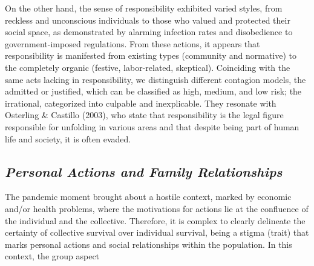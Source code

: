 \documentclass{article}
\begin{document}
On the other hand, the sense of responsibility exhibited varied styles, from reckless and unconscious individuals to those who valued and protected their social space, as demonstrated by alarming infection rates and disobedience to government-imposed regulations. From these actions, it appears that responsibility is manifested from existing types (community and normative) to the completely organic (festive, labor-related, skeptical). Coinciding with the same acts lacking in responsibility, we distinguish different contagion models, the admitted or justified, which can be classified as high, medium, and low risk; the irrational, categorized into culpable and inexplicable. They resonate with Osterling \& Castillo (2003), who state that responsibility is the legal figure responsible for unfolding in various areas and that despite being part of human life and society, it is often evaded.

\subsection{\textit{Personal Actions and Family Relationships}}

The pandemic moment brought about a hostile context, marked by economic and/or health problems, where the motivations for actions lie at the confluence of the individual and the collective. Therefore, it is complex to clearly delineate the certainty of collective survival over individual survival, being a stigma (trait) that marks personal actions and social relationships within the population. In this context, the group aspect
\end{document}
